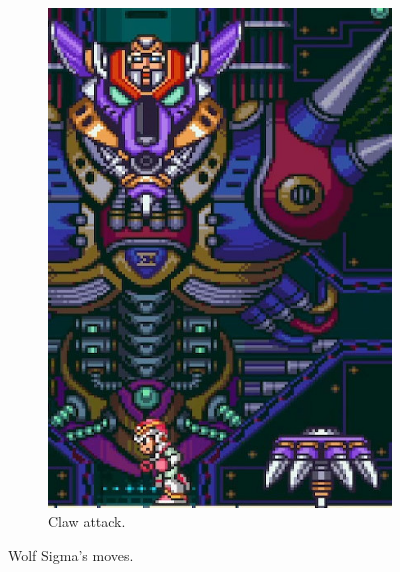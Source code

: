 \begin{figure}[htp]
\begin{subfigure}[t]{0.3\linewidth}
		\includegraphics[width=\linewidth]{figures/X1/Sigma_stages/WolfSigma_claw.jpg}
		\caption{Claw attack.}
	\end{subfigure}
	\caption{Wolf Sigma's moves.}
\end{figure} 


